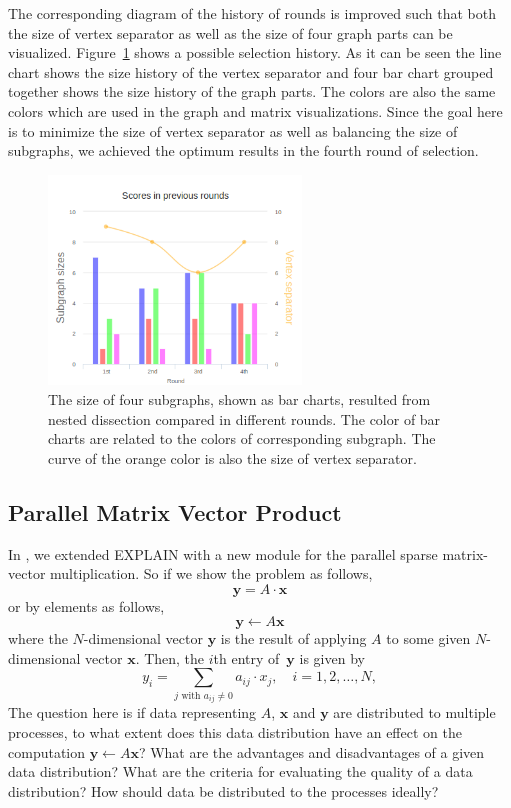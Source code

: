 \documentclass[11pt, twoside,a4paper]{book}
\newcommand{\mat}[1]{\ensuremath{#1}}
\newcommand{\vek}[1]{{\ensuremath{\mathbf #1}}}
\begin{document}
The corresponding diagram of the history of rounds is improved such that
both the size of vertex separator as well as the size of four graph parts
can be visualized. Figure~\ref{barchart} shows a possible selection history.
As it can be seen the line chart shows the size history of the vertex separator
and four bar chart grouped together shows the size history of the graph parts.
The colors are also the same colors which are used in the graph and matrix visualizations.
Since the goal here is to minimize the size of vertex separator as well as balancing the 
size of subgraphs, we achieved the optimum results in the fourth round of selection.
\begin{figure}
\centering
\includegraphics[width=0.6\textwidth]{chart2}
\caption{The size of four subgraphs, shown as bar charts,
resulted from nested dissection compared in different rounds.
The color of bar charts are related to the colors of corresponding subgraph.
The curve of the orange color is also the size of vertex separator.}
\label{barchart}
\end{figure}

\subsection{Parallel Matrix Vector Product}

In \cite{2015:3}, we extended EXPLAIN with a new module for
the parallel sparse matrix-vector multiplication.
So if we show the problem as follows,
$$
\vek{y} = \mat{A}\cdot \vek{x}
$$
or by elements as follows,
\begin{equation}
\label{e.yax}
\vek{y} \leftarrow \mat{A} \vek{x}
\end{equation}
where the $N$-dimensional vector $\vek{y}$ is the result of applying \mat{A} to some
given $N$-dimen\-sional vector $\vek{x}$. Then, the $i$th entry of~$\vek{y}$ is given by
\begin{equation}
\label{e.mvp}
y_i = \sum_{j \text{ with } a_{ij} \neq 0} a_{ij} \cdot x_j ,
\quad
i = 1, 2, \dots, N,
\end{equation}
The question here is if data representing \mat{A}, \vek{x} and
\vek{y} are distributed to multiple processes, to what extent does this data distribution
have an effect on the computation $\vek{y} \leftarrow \mat{A} \vek{x}$? What are the
advantages and disadvantages of a given data distribution? What are the criteria for
evaluating the quality of a data distribution? How should data be distributed to the
processes ideally?
\end{document}
